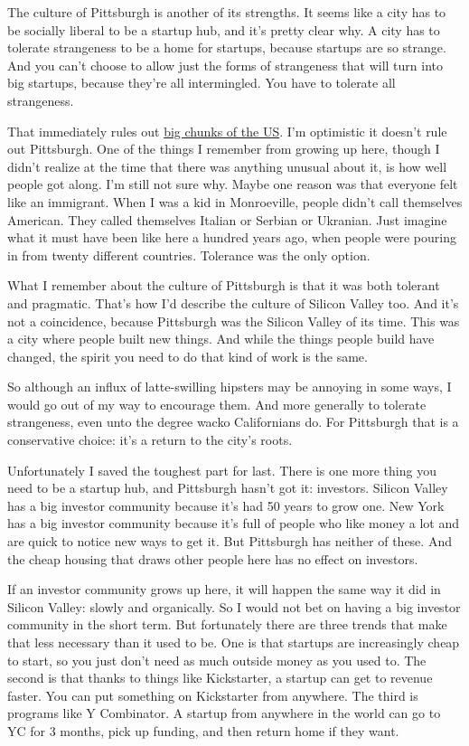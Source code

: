 \documentclass[12pt]{book}
\begin{document}
The culture of Pittsburgh is another of its strengths. It seems like a
city has to be socially liberal to be a startup hub, and it's pretty
clear why. A city has to tolerate strangeness to be a home for startups,
because startups are so strange. And you can't choose to allow just the
forms of strangeness that will turn into big startups, because they're
all intermingled. You have to tolerate all strangeness.

That immediately rules out
\href{http://www.nytimes.com/2016/04/06/us/gay-rights-mississippi-north-carolina.html}{big
chunks of the US}. I'm optimistic it doesn't rule out Pittsburgh. One of
the things I remember from growing up here, though I didn't realize at
the time that there was anything unusual about it, is how well people
got along. I'm still not sure why. Maybe one reason was that everyone
felt like an immigrant. When I was a kid in Monroeville, people didn't
call themselves American. They called themselves Italian or Serbian or
Ukranian. Just imagine what it must have been like here a hundred years
ago, when people were pouring in from twenty different countries.
Tolerance was the only option.

What I remember about the culture of Pittsburgh is that it was both
tolerant and pragmatic. That's how I'd describe the culture of Silicon
Valley too. And it's not a coincidence, because Pittsburgh was the
Silicon Valley of its time. This was a city where people built new
things. And while the things people build have changed, the spirit you
need to do that kind of work is the same.

So although an influx of latte-swilling hipsters may be annoying in some
ways, I would go out of my way to encourage them. And more generally to
tolerate strangeness, even unto the degree wacko Californians do. For
Pittsburgh that is a conservative choice: it's a return to the city's
roots.

Unfortunately I saved the toughest part for last. There is one more
thing you need to be a startup hub, and Pittsburgh hasn't got it:
investors. Silicon Valley has a big investor community because it's had
50 years to grow one. New York has a big investor community because it's
full of people who like money a lot and are quick to notice new ways to
get it. But Pittsburgh has neither of these. And the cheap housing that
draws other people here has no effect on investors.

If an investor community grows up here, it will happen the same way it
did in Silicon Valley: slowly and organically. So I would not bet on
having a big investor community in the short term. But fortunately there
are three trends that make that less necessary than it used to be. One
is that startups are increasingly cheap to start, so you just don't need
as much outside money as you used to. The second is that thanks to
things like Kickstarter, a startup can get to revenue faster. You can
put something on Kickstarter from anywhere. The third is programs like Y
Combinator. A startup from anywhere in the world can go to YC for 3
months, pick up funding, and then return home if they want.
\end{document}
